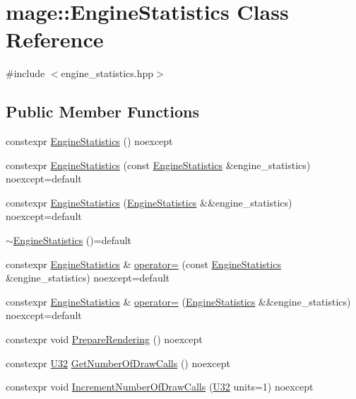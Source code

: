 \hypertarget{classmage_1_1_engine_statistics}{}\section{mage\+:\+:Engine\+Statistics Class Reference}
\label{classmage_1_1_engine_statistics}


{\ttfamily \#include $<$engine\+\_\+statistics.\+hpp$>$}

\subsection*{Public Member Functions}
\begin{DoxyCompactItemize}
\item 
constexpr \hyperlink{classmage_1_1_engine_statistics_a0f0d19fdbdf37d28feb2885c0cc2b6a0}{Engine\+Statistics} () noexcept
\item 
constexpr \hyperlink{classmage_1_1_engine_statistics_a6191d7a64cf2bb46a404a12e7cfafbb5}{Engine\+Statistics} (const \hyperlink{classmage_1_1_engine_statistics}{Engine\+Statistics} \&engine\+\_\+statistics) noexcept=default
\item 
constexpr \hyperlink{classmage_1_1_engine_statistics_ab68e329a6f614be99d773e026b2233de}{Engine\+Statistics} (\hyperlink{classmage_1_1_engine_statistics}{Engine\+Statistics} \&\&engine\+\_\+statistics) noexcept=default
\item 
\hyperlink{classmage_1_1_engine_statistics_a471f643061b881ae69cc807b34c48127}{$\sim$\+Engine\+Statistics} ()=default
\item 
constexpr \hyperlink{classmage_1_1_engine_statistics}{Engine\+Statistics} \& \hyperlink{classmage_1_1_engine_statistics_aad037dd90928e14e810b53de66e7cd80}{operator=} (const \hyperlink{classmage_1_1_engine_statistics}{Engine\+Statistics} \&engine\+\_\+statistics) noexcept=default
\item 
constexpr \hyperlink{classmage_1_1_engine_statistics}{Engine\+Statistics} \& \hyperlink{classmage_1_1_engine_statistics_a01cddf6fa3409e1dbd07b6d0055d1fcc}{operator=} (\hyperlink{classmage_1_1_engine_statistics}{Engine\+Statistics} \&\&engine\+\_\+statistics) noexcept=default
\item 
constexpr void \hyperlink{classmage_1_1_engine_statistics_a15eaca9bc77798a83e9c1a51fe6c7933}{Prepare\+Rendering} () noexcept
\item 
constexpr \hyperlink{namespacemage_a41c104c036fba3756a74e19f793eeaa1}{U32} \hyperlink{classmage_1_1_engine_statistics_a8c9a6691cec0c6544c4fb2e426ab4379}{Get\+Number\+Of\+Draw\+Calls} () noexcept
\item 
constexpr void \hyperlink{classmage_1_1_engine_statistics_abd7d06c31fb163cec7938342e75ebc9d}{Increment\+Number\+Of\+Draw\+Calls} (\hyperlink{namespacemage_a41c104c036fba3756a74e19f793eeaa1}{U32} units=1) noexcept
\end{DoxyCompactItemize}
